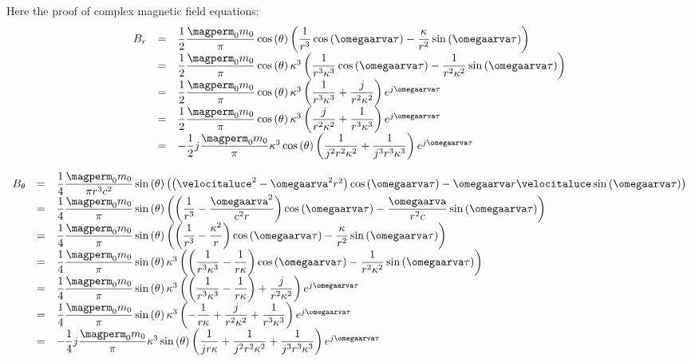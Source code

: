 Here the proof of complex magnetic field equations:
\[
\begin{array}{rcl}
B_r & = & \dfrac{1}{2} \dfrac{\magperm_0 m_0}{\pi} \ccos{\theta} \braces{\dfrac{1}{r^3}\ccos{\omegaarva \tau} - \dfrac{\kappa}{r^2} \ssin{\omegaarva \tau}} \\
 & = & \dfrac{1}{2} \dfrac{\magperm_0 m_0}{\pi} \ccos{\theta} \kappa^3 \braces{ \dfrac{1}{r^3 \kappa^3} \ccos{\omegaarva\tau} - \dfrac{1}{r^2 \kappa^2} \ssin{\omegaarva\tau} } \\
 & = & \dfrac{1}{2} \dfrac{\magperm_0 m_0}{\pi} \ccos{\theta} \kappa^3 \braces{ \dfrac{1}{r^3 \kappa^3} + \dfrac{j}{r^2 \kappa^2}} e^{j\omegaarva \tau} \\
 & = & \dfrac{1}{2} \dfrac{\magperm_0 m_0}{\pi} \ccos{\theta} \kappa^3 \braces{ \dfrac{j}{r^2 \kappa^2} + \dfrac{1}{r^3 \kappa^3}} e^{j\omegaarva \tau} \\
 & = & -\dfrac{1}{2} j \dfrac{\magperm_0 m_0}{\pi} \kappa^3 \ccos{\theta} \braces{\dfrac{1}{j^2 r^2 \kappa^2} + \dfrac{1}{j^3 r^3 \kappa^3}} e^{j\omegaarva \tau}
\end{array}
\]

\[
\begin{array}{rcl}
B_{\theta} & = & \dfrac{1}{4} \dfrac{\magperm_0 m_0}{\pi r^3 c^2} \ssin{\theta} \braces{\braces{\velocitaluce^2 - \omegaarva^2 r^2}\ccos{\omegaarva \tau} - \omegaarva r \velocitaluce \ssin{\omegaarva \tau}} \\
 & = & \dfrac{1}{4} \dfrac{\magperm_0 m_0}{\pi} \ssin{\theta} \braces{ \braces{\dfrac{1}{r^3}-\dfrac{\omegaarva^2}{c^2 r}}\ccos{\omegaarva \tau} - \dfrac{\omegaarva}{r^2 c} \ssin{\omegaarva \tau}} \\
 & = & \dfrac{1}{4} \dfrac{\magperm_0 m_0}{\pi} \ssin{\theta} \braces{ \braces{\dfrac{1}{r^3}-\dfrac{\kappa^2}{r}}\ccos{\omegaarva \tau} - \dfrac{\kappa}{r^2} \ssin{\omegaarva \tau}} \\
 & = & \dfrac{1}{4} \dfrac{\magperm_0 m_0}{\pi} \ssin{\theta} \kappa^3 \braces{ \braces{\dfrac{1}{r^3 \kappa^3}-\dfrac{1}{r \kappa}}\ccos{\omegaarva \tau} - \dfrac{1}{r^2 \kappa^2} \ssin{\omegaarva \tau}} \\
 & = & \dfrac{1}{4} \dfrac{\magperm_0 m_0}{\pi} \ssin{\theta} \kappa^3 \braces{ \braces{\dfrac{1}{r^3 \kappa^3}-\dfrac{1}{r \kappa}} + \dfrac{j}{r^2 \kappa^2}} e^{j\omegaarva \tau} \\
 & = & \dfrac{1}{4} \dfrac{\magperm_0 m_0}{\pi} \ssin{\theta} \kappa^3 \braces{-\dfrac{1}{r \kappa} + \dfrac{j}{r^2 \kappa^2} + \dfrac{1}{r^3 \kappa^3}} e^{j\omegaarva \tau} \\
 & = & -\dfrac{1}{4} j \dfrac{\magperm_0 m_0}{\pi} \kappa^3 \ssin{\theta} \braces{\dfrac{1}{j r \kappa} + \dfrac{1}{j^2 r^2 \kappa^2} + \dfrac{1}{j^3 r^3 \kappa^3}} e^{j\omegaarva \tau}
\end{array}
\]

